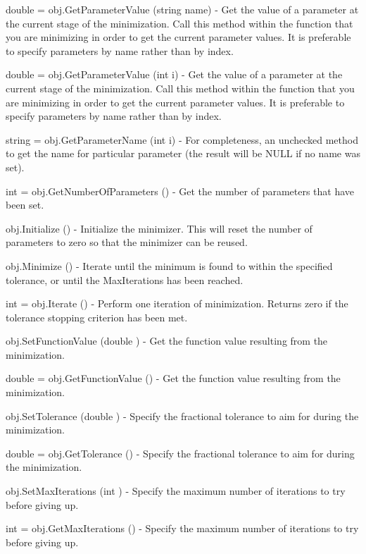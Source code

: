 \begin{DoxyItemize}
\item {\ttfamily double = obj.\-Get\-Parameter\-Value (string name)} -\/ Get the value of a parameter at the current stage of the minimization. Call this method within the function that you are minimizing in order to get the current parameter values. It is preferable to specify parameters by name rather than by index.  
\item {\ttfamily double = obj.\-Get\-Parameter\-Value (int i)} -\/ Get the value of a parameter at the current stage of the minimization. Call this method within the function that you are minimizing in order to get the current parameter values. It is preferable to specify parameters by name rather than by index.  
\item {\ttfamily string = obj.\-Get\-Parameter\-Name (int i)} -\/ For completeness, an unchecked method to get the name for particular parameter (the result will be N\-U\-L\-L if no name was set).  
\item {\ttfamily int = obj.\-Get\-Number\-Of\-Parameters ()} -\/ Get the number of parameters that have been set.  
\item {\ttfamily obj.\-Initialize ()} -\/ Initialize the minimizer. This will reset the number of parameters to zero so that the minimizer can be reused.  
\item {\ttfamily obj.\-Minimize ()} -\/ Iterate until the minimum is found to within the specified tolerance, or until the Max\-Iterations has been reached.  
\item {\ttfamily int = obj.\-Iterate ()} -\/ Perform one iteration of minimization. Returns zero if the tolerance stopping criterion has been met.  
\item {\ttfamily obj.\-Set\-Function\-Value (double )} -\/ Get the function value resulting from the minimization.  
\item {\ttfamily double = obj.\-Get\-Function\-Value ()} -\/ Get the function value resulting from the minimization.  
\item {\ttfamily obj.\-Set\-Tolerance (double )} -\/ Specify the fractional tolerance to aim for during the minimization.  
\item {\ttfamily double = obj.\-Get\-Tolerance ()} -\/ Specify the fractional tolerance to aim for during the minimization.  
\item {\ttfamily obj.\-Set\-Max\-Iterations (int )} -\/ Specify the maximum number of iterations to try before giving up.  
\item {\ttfamily int = obj.\-Get\-Max\-Iterations ()} -\/ Specify the maximum number of iterations to try before giving up.  

\end{DoxyItemize}
